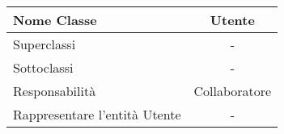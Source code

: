 
\setcounter{table}{0}
\begin{table}[H]
    \centering
    \begin{tabular}{||   l  ||  c   ||}
        \hline
        \rowcolor{Gray}
        Nome Classe & Utente\\
        \hline
        Superclassi  &  - \\
        \hline
        Sottoclassi & - \\
        \hline
        \hline
         Responsabilità & Collaboratore \\
         \hline
          Rappresentare l'entità Utente & - \\
         \hline
    \end{tabular}
\end{table}

    
       
